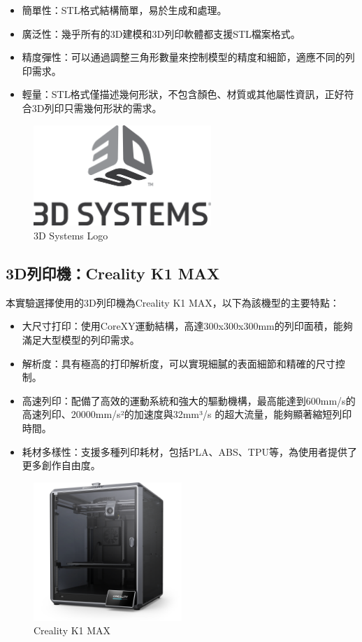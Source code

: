 \documentclass[class=NCU_thesis, crop=false]{standalone}
\begin{document}
\begin{itemize}
    \item 簡單性：STL格式結構簡單，易於生成和處理。
    \item 廣泛性：幾乎所有的3D建模和3D列印軟體都支援STL檔案格式。
    \item 精度彈性：可以通過調整三角形數量來控制模型的精度和細節，適應不同的列印需求。
    \item 輕量：STL格式僅描述幾何形狀，不包含顏色、材質或其他屬性資訊，正好符合3D列印只需幾何形狀的需求。
\end{itemize}

\begin{figure}[htbp]
    \centering
    \includegraphics[width=0.6\textwidth]{figures/3D_Systems_Logo.png}
\caption{3D Systems Logo~\cite{3dsystems_echo_dot}}
\end{figure}

\subsection{3D列印機：Creality K1 MAX}
本實驗選擇使用的3D列印機為Creality K1 MAX，以下為該機型的主要特點：
\begin{itemize}
    \item 大尺寸打印：使用CoreXY運動結構，高達300x300x300mm的列印面積，能夠滿足大型模型的列印需求。
    \item 解析度：具有極高的打印解析度，可以實現細膩的表面細節和精確的尺寸控制。
    \item 高速列印：配備了高效的運動系統和強大的驅動機構，最高能達到600mm/s的高速列印、20000mm/s²的加速度與32mm³/s 的超大流量，能夠顯著縮短列印時間。
    \item 耗材多樣性：支援多種列印耗材，包括PLA、ABS、TPU等，為使用者提供了更多創作自由度。
\end{itemize}

\begin{figure}[htbp]
    \centering
    \includegraphics[width=0.5\textwidth]{figures/creality-k1-max.png}
\caption{Creality K1 MAX~\cite{creality_echo_dot}}
\end{figure}
\end{document}
